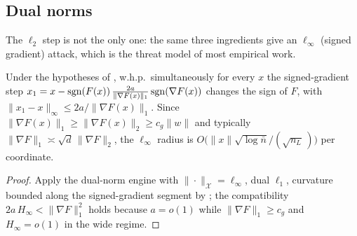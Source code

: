 \subsection{Dual norms}
The $\ell_2$ step is not the only one: the same three ingredients give an $\ell_\infty$ (signed
gradient) attack, which is the threat model of most empirical work.

\begin{corollary}\label{cor:linf}
Under the hypotheses of , w.h.p.\ simultaneously for every $x$ the signed-gradient
step $x_1=x-\operatorname{sgn}(F(x))\,\tfrac{2a}{\|\nabla F(x)\|_1}\operatorname{sgn}(\nabla F(x))$ changes the sign of $F$, with
$\|x_1-x\|_\infty\le 2a/\|\nabla F(x)\|_1$. Since $\|\nabla F(x)\|_1\ge\|\nabla F(x)\|_2\ge c_g\|w\|$
and typically $\|\nabla F\|_1\asymp\sqrt d\,\|\nabla F\|_2$, the $\ell_\infty$ radius is
$O\!\bigl(\|x\|\sqrt{\log\bar n}/(\sqrt{n_L}\,)\bigr)$ per coordinate.
\end{corollary}

\begin{proof}
Apply the dual-norm engine \cite[Thm 4.7, Cor 4.8]{advExt} with $\|\cdot\|_{\mathcal X}=\ell_\infty$,
dual $\ell_1$, curvature bounded along the signed-gradient segment by ; the
compatibility $2a\,H_\infty<\|\nabla F\|_1^2$ holds because $a=o(1)$ while $\|\nabla F\|_1\ge c_g$ and
$H_\infty=o(1)$ in the wide regime.
\end{proof}
